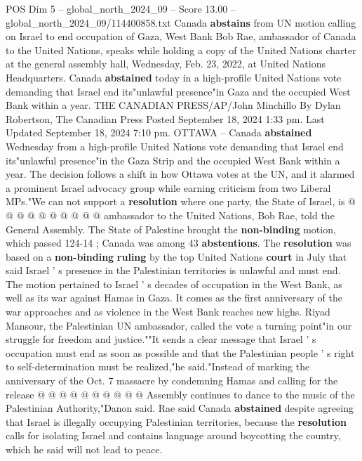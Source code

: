\begin{textsample}{POS Dim 5 – global\_north\_2024\_09 – Score 13.00 – global\_north\_2024\_09/114400858.txt}  \label{ex:f5_pos_319}
Canada \textbf{abstains} from UN motion calling on Israel to end occupation of Gaza, West Bank Bob Rae, ambassador of Canada to the United Nations, speaks while holding a copy of the United Nations charter at the general assembly hall, Wednesday, Feb. 23, 2022, at United Nations Headquarters.
Canada \textbf{abstained} today in a high-profile United Nations vote demanding that Israel end its"unlawful presence"in Gaza and the occupied West Bank within a year.
THE CANADIAN PRESS/AP/John Minchillo By Dylan Robertson, The Canadian Press Posted September 18, 2024 1:33 pm.
Last Updated September 18, 2024 7:10 pm.
OTTAWA -- Canada \textbf{abstained} Wednesday from a high-profile United Nations vote demanding that Israel end its"unlawful presence"in the Gaza Strip and the occupied West Bank within a year.
The decision follows a shift in how Ottawa votes at the UN, and it alarmed a prominent Israel advocacy group while earning criticism from two Liberal MPs."We can not support a \textbf{resolution} where one party, the State of Israel, is @ @ @ @ @ @ @ @ @ @ ambassador to the United Nations, Bob Rae, told the General Assembly.
The State of Palestine brought the \textbf{non-binding} motion, which passed 124-14 ; Canada was among 43 \textbf{abstentions}.
The \textbf{resolution} was based on a \textbf{non-binding} \textbf{ruling} by the top United Nations \textbf{court} in July that said Israel ' s presence in the Palestinian territories is unlawful and must end.
The motion pertained to Israel ' s decades of occupation in the West Bank, as well as its war against Hamas in Gaza.
It comes as the first anniversary of the war approaches and as violence in the West Bank reaches new highs.
Riyad Mansour, the Palestinian UN ambassador, called the vote a turning point"in our struggle for freedom and justice.""It sends a clear message that Israel ' s occupation must end as soon as possible and that the Palestinian people ' s right to self-determination must be realized,"he said."Instead of marking the anniversary of the Oct. 7 massacre by condemning Hamas and calling for the release @ @ @ @ @ @ @ @ @ @ Assembly continues to dance to the music of the Palestinian Authority,"Danon said.
Rae said Canada \textbf{abstained} despite agreeing that Israel is illegally occupying Palestinian territories, because the \textbf{resolution} calls for isolating Israel and contains language around boycotting the country, which he said will not lead to peace.

\end{textsample}
